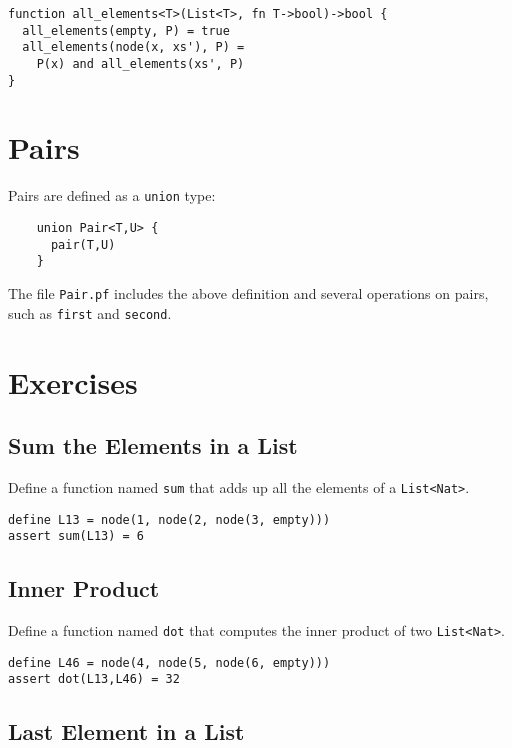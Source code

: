 \documentclass[12pt]{article}
\begin{document}
\begin{verbatim}
function all_elements<T>(List<T>, fn T->bool)->bool {
  all_elements(empty, P) = true
  all_elements(node(x, xs'), P) = 
    P(x) and all_elements(xs', P)
}
\end{verbatim}

\section{Pairs}

Pairs are defined as a \texttt{union} type:

\begin{verbatim}
    union Pair<T,U> {
      pair(T,U)
    }
\end{verbatim}

The file \texttt{Pair.pf} includes the above definition and several
operations on pairs, such as \texttt{first} and \texttt{second}.

\section{Exercises}

\subsection{Sum the Elements in a List}

Define a function named \texttt{sum} that adds up all the elements of a \texttt{List<Nat>}.

\begin{verbatim}
define L13 = node(1, node(2, node(3, empty)))
assert sum(L13) = 6
\end{verbatim}

\subsection{Inner Product}

Define a function named \texttt{dot} that computes the inner product of two \texttt{List<Nat>}.

\begin{verbatim}
define L46 = node(4, node(5, node(6, empty)))
assert dot(L13,L46) = 32
\end{verbatim}

\subsection{Last Element in a List}
\end{document}
